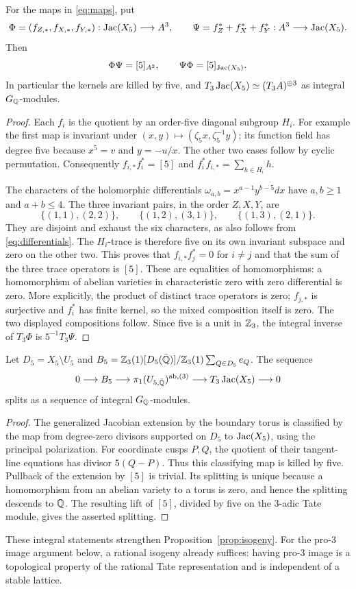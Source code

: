 \begin{proposition}
\label{prop:quintic-five-isogeny}
For the maps in \eqref{eq:maps}, put
\[
 \Phi=(f_{Z,*},f_{X,*},f_{Y,*}):\operatorname{Jac}(X_5)\longrightarrow A^3,
 \qquad
 \Psi=f_Z^*+f_X^*+f_Y^*:A^3\longrightarrow\operatorname{Jac}(X_5).
\]
Then
\[
 \Phi\Psi=[5]_{A^3},\qquad \Psi\Phi=[5]_{\operatorname{Jac}(X_5)}.
\]
In particular the kernels are killed by five, and
$T_3\operatorname{Jac}(X_5)\simeq(T_3A)^{\oplus3}$ as integral $G_\mathbb Q$-modules.
\end{proposition}
\begin{proof}
Each $f_i$ is the quotient by an order-five diagonal subgroup $H_i$.
For example the first map is invariant under
$(x,y)\mapsto(\zeta_5x,\zeta_5^{-1}y)$; its function field has
degree five because $x^5=v$ and $y=-u/x$.
The other two cases follow by cyclic permutation.
Consequently $f_{i,*}f_i^*=[5]$ and
$f_i^*f_{i,*}=\sum_{h\in H_i}h$.

The characters of the holomorphic differentials
$\omega_{a,b}=x^{a-1}y^{b-5}dx$ have $a,b\ge1$ and $a+b\le4$.
The three invariant pairs, in the order $Z,X,Y$, are
\[
 \{(1,1),(2,2)\},\qquad
 \{(1,2),(3,1)\},\qquad
 \{(1,3),(2,1)\}.
\]
They are disjoint and exhaust the six characters, as also follows
from \eqref{eq:differentials}. The $H_i$-trace is therefore five
on its own invariant subspace and zero on the other two. This
proves that $f_{i,*}f_j^*=0$ for $i\ne j$ and that the sum of
the three trace operators is $[5]$. These are equalities of
homomorphisms: a homomorphism of abelian varieties in characteristic
zero with zero differential is zero. More explicitly, the product
of distinct trace operators is zero; $f_{j,*}$ is surjective and
$f_i^*$ has finite kernel, so the mixed composition itself is zero.
The two displayed compositions
follow. Since five is a unit in $\mathbb Z_3$, the integral inverse of
$T_3\Phi$ is $5^{-1}T_3\Psi$.
\end{proof}

\begin{lemma}
\label{lem:quintic-boundary-split}
Let $D_5=X_5\setminus U_5$ and
$B_5=\mathbb Z_3(1)[D_5(\bar{\mathbb Q})]/\mathbb Z_3(1)\sum_{Q\in D_5}e_Q$.
The sequence
\[
 0\longrightarrow B_5\longrightarrow
 \pi_1(U_{5,\bar{\mathbb Q}})^{\mathrm{ab},(3)}
 \longrightarrow T_3\operatorname{Jac}(X_5)\longrightarrow0
\]
splits as a sequence of integral $G_\mathbb Q$-modules.
\end{lemma}
\begin{proof}
The generalized Jacobian extension by the boundary torus is
classified by the map from degree-zero divisors supported on $D_5$
to $\operatorname{Jac}(X_5)$, using the principal polarization.
For coordinate cusps $P,Q$, the quotient of their tangent-line
equations has divisor $5(Q-P)$. Thus this classifying map is killed
by five. Pullback of the extension by $[5]$ is trivial. Its splitting
is unique because a homomorphism from an abelian variety to a torus
is zero, and hence the splitting descends to $\mathbb Q$.
The resulting lift of $[5]$, divided by five on the $3$-adic Tate
module, gives the asserted splitting.
\end{proof}

These integral statements strengthen Proposition~\ref{prop:isogeny}.
For the pro-$3$ image argument below, a rational isogeny already
suffices: having pro-$3$ image is a topological property of the
rational Tate representation and is independent of a stable lattice.
